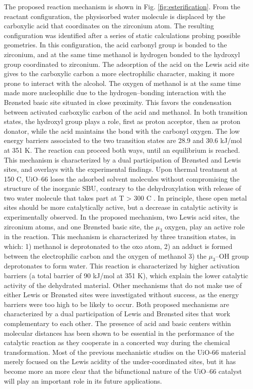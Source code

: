 The proposed reaction mechanism is shown in Fig. \ref{fig:esterification}. From the reactant configuration, the physisorbed water molecule is displaced by the carboxylic acid that coordinates on the zirconium atom. The resulting configuration was identified after a series of static calculations probing possible geometries. In this configuration, the acid carbonyl group is bonded to the zirconium, and at the same time methanol is hydrogen bonded to the hydroxyl group coordinated to zirconium. The adsorption of the acid on the Lewis acid site gives to the carboxylic carbon a more electrophilic character, making it more prone to interact with the alcohol. The oxygen of methanol is at the same time made more nucleophilic due to the hydrogen--bonding interaction with the Br\o{}nsted basic site situated in close proximity. This favors the condensation between activated carboxylic carbon of the acid and methanol. In both transition states, the hydroxyl group plays a role, first as proton acceptor, then as proton donator, while the acid maintains the bond with the carbonyl oxygen. The low energy barriers associated to the two transition states are 28.9 and 30.6 kJ/mol at 351 K. The reaction can proceed both ways, until an equilibrium is reached. This mechanism is characterized by a dual participation of Br\o{}nsted and Lewis sites, and overlays with the experimental findings.
\npar
Upon thermal treatment at 150 C, UiO--66 loses the adsorbed solvent molecules without compromising the structure of the inorganic SBU, contrary to the dehydroxylation with release of two water molecule that takes part at T > 300 C \cite{valenzano2011disclosing}. In principle, these open metal sites should be more catalytically active, but a decrease in catalytic activity is experimentally observed. In the proposed mechanism, two Lewis acid sites, the zirconium atoms, and one Br\o{}nsted basic site, the $\mu_3$ oxygen, play an active role in the reaction. This mechanism is characterized by three transition states, in which: 1) methanol is deprotonated to the oxo atom, 2) an adduct is formed between the electrophilic carbon and the oxygen of methanol 3) the $\mu_3$--OH group deprotonates to form water. This reaction is characterized by higher activation barriers (a total barrier of 90 kJ/mol at 351 K), which explain the lower catalytic activity of the dehydrated material.
\npar
Other mechanisms that do not make use of either Lewis or Br\o{}nsted sites were investigated without success, as the energy barriers were too high to be likely to occur. Both proposed mechanisms are characterized by a dual participation of Lewis and Br\o{}nsted sites that work complementary to each other.  The presence of acid and basic centers within molecular distances has been shown to be essential in the performance of the catalytic reaction as they cooperate in a concerted way during the chemical transformation. Most of the previous mechanistic studies on the UiO-66 material merely focused on the Lewis acidity of the under-coordinated sites, but it has become more an more clear that the bifunctional nature of the UiO--66 catalyst will play an important role in its future applications.

